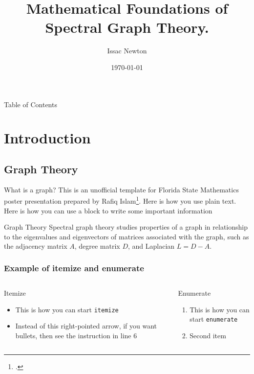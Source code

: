 \documentclass{ctexbeamer}
\title[A short version of the title goes here]{Mathematical Foundations of Spectral Graph Theory.}
\author[Newton]{Issac Newton}
\institute{Florida State University}
\date{\today}
\begin{document}
\maketitle

\begin{frame}{Table of Contents}
\tableofcontents[subsectionstyle=hide, sectionstyle=show]
\end{frame}
\section{Introduction}
\subsection{Graph Theory}
\begin{frame}{What is a graph?}
    This is an unofficial template for Florida State Mathematics poster presentation prepared by Rafiq 
    Islam\footcite{fsumathposter25}. Here is how you use plain text. Here is how you can use a block to write some important information \cite{fsubeamerpresent25}
    \begin{block}{Graph Theory}
        Spectral graph theory studies properties of a graph in relationship to the eigenvalues and eigenvectors of matrices associated with the graph, such as the adjacency matrix $A$, degree matrix $D$, and Laplacian $L = D - A$.
    \end{block}
\end{frame}
\begin{frame}
    \frametitle{Example of itemize and enumerate}
    \begin{columns}[t,totalwidth=\textwidth]
        \begin{column}{0.5\textwidth}
            \begin{block}{Itemize}
                \begin{itemize}
                    \item This is how you can start \texttt{itemize}
                    \item Instead of this right-pointed arrow, if you want bullets, then see the instruction in line 6
                \end{itemize}
            \end{block}
        \end{column}
        \begin{column}{0.5\textwidth}
            \begin{block}{Enumerate}
                \begin{enumerate}
                    \item This is how you can start \texttt{enumerate}
                    \item Second item
                \end{enumerate}
            \end{block}
        \end{column}
    \end{columns}
\end{frame}
\end{document}
